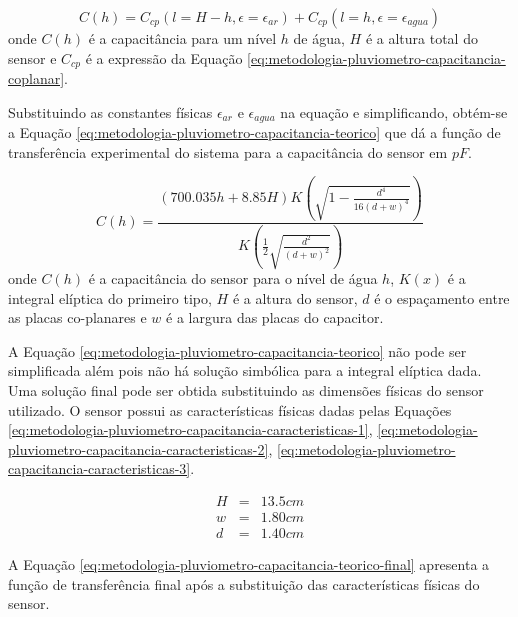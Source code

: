 \documentclass[a4paper]{instrumentacao}
\begin{document}
\begin{equation}
	C(h) = C_{cp}\left(l=H-h, \epsilon=\epsilon_{ar}\right) + C_{cp}\left(l=h, \epsilon=\epsilon_{agua}\right)
	\label{eq:metodologia-pluviometro-capacitancia-relacao}
\end{equation}
\noindent onde $C(h)$ é a capacitância para um nível $h$ de água, $H$ é a altura total do sensor e $C_{cp}$ é a expressão da Equação \ref{eq:metodologia-pluviometro-capacitancia-coplanar}.

Substituindo as constantes físicas $\epsilon_{ar}$ e $\epsilon_{agua}$ na equação e simplificando, obtém-se a Equação \ref{eq:metodologia-pluviometro-capacitancia-teorico} que dá a função de transferência experimental do sistema para a capacitância do sensor em $pF$.

\begin{equation}
	C(h) = \frac{(700.035 h+8.85 H) K\left(\sqrt{1-\frac{d^4}{16 (d+w)^4}}\right)}{K\left(\frac{1}{2} \sqrt{\frac{d^2}{(d+w)^2}}\right)}
	\label{eq:metodologia-pluviometro-capacitancia-teorico}
\end{equation}
\noindent onde $C(h)$ é a capacitância do sensor para o nível de água $h$, $K(x)$ é a integral elíptica do primeiro tipo, $H$ é a altura do sensor, $d$ é o espaçamento entre as placas co-planares e $w$ é a largura das placas do capacitor.

A Equação \ref{eq:metodologia-pluviometro-capacitancia-teorico} não pode ser simplificada além pois não há solução simbólica para a integral elíptica dada. Uma solução final pode ser obtida substituindo as dimensões físicas do sensor utilizado. O sensor possui as características físicas dadas pelas Equações \ref{eq:metodologia-pluviometro-capacitancia-caracteristicas-1}, \ref{eq:metodologia-pluviometro-capacitancia-caracteristicas-2}, \ref{eq:metodologia-pluviometro-capacitancia-caracteristicas-3}.

\begin{eqnarray}
	H &=& 13.5cm \label{eq:metodologia-pluviometro-capacitancia-caracteristicas-1} \\
	w &=& 1.80cm \label{eq:metodologia-pluviometro-capacitancia-caracteristicas-2} \\
	d &=& 1.40cm \label{eq:metodologia-pluviometro-capacitancia-caracteristicas-3}
\end{eqnarray}

A Equação \ref{eq:metodologia-pluviometro-capacitancia-teorico-final} apresenta a função de transferência final após a substituição das características físicas do sensor.
\end{document}

